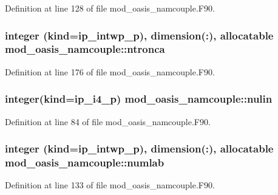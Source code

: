 Definition at line 128 of file mod\+\_\+oasis\+\_\+namcouple.\+F90.

\hypertarget{classmod__oasis__namcouple_aaf9fd5eaa5d115f2548b8f78cdcd172d}{
\subsubsection[{ntronca}]{\setlength{\rightskip}{0pt plus 5cm}integer (kind=ip\+\_\+intwp\+\_\+p), dimension(\+:), allocatable mod\+\_\+oasis\+\_\+namcouple\+::ntronca\hspace{0.3cm}{\ttfamily [private]}}}\label{classmod__oasis__namcouple_aaf9fd5eaa5d115f2548b8f78cdcd172d}


Definition at line 176 of file mod\+\_\+oasis\+\_\+namcouple.\+F90.

\hypertarget{classmod__oasis__namcouple_a36ef9483c332254e38c52b1d78d26f1f}{
\subsubsection[{nulin}]{\setlength{\rightskip}{0pt plus 5cm}integer(kind=ip\+\_\+i4\+\_\+p) mod\+\_\+oasis\+\_\+namcouple\+::nulin\hspace{0.3cm}{\ttfamily [private]}}}\label{classmod__oasis__namcouple_a36ef9483c332254e38c52b1d78d26f1f}


Definition at line 84 of file mod\+\_\+oasis\+\_\+namcouple.\+F90.

\hypertarget{classmod__oasis__namcouple_a12e1621f5697a0cdbde11d3e25f43b54}{
\subsubsection[{numlab}]{\setlength{\rightskip}{0pt plus 5cm}integer (kind=ip\+\_\+intwp\+\_\+p), dimension(\+:), allocatable mod\+\_\+oasis\+\_\+namcouple\+::numlab\hspace{0.3cm}{\ttfamily [private]}}}\label{classmod__oasis__namcouple_a12e1621f5697a0cdbde11d3e25f43b54}


Definition at line 133 of file mod\+\_\+oasis\+\_\+namcouple.\+F90.

